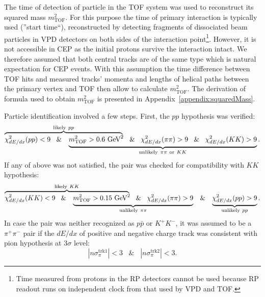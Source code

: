 The time of detection of particle in the TOF system was used to reconstruct its squared mass $m^{2}_{\text{TOF}}$. For this purpose the time of primary interaction is typically used (''start time``), reconstructed by detecting fragments of dissociated beam particles in VPD detectors on both sides of the interaction point\footnote{Time measured from protons in the RP detectors cannot be used because RP readout runs on independent clock from that used by VPD and TOF.}. However, it is not accessible in CEP as the initial protons survive the interaction intact. We therefore assumed that both central tracks are of the same type which is natural expectation for CEP events. With this assumption the time difference between TOF hits and measured tracks' momenta and lengths of helical paths between the primary vertex and TOF then allow to calculate $m^{2}_{\text{TOF}}$. The derivation of formula used to obtain $m^{2}_{\text{TOF}}$ is presented in Appendix~\ref{appendix:squaredMass}.

Particle identification involved a few steps. First, the $pp$ hypothesis was verified:
\begin{equation}\label{eq:pidPPbar}\lefteqn{\overbrace{\phantom{\chi^{2}_{dE/dx}(pp)<9\;\;\; \& \;\;\; m^{2}_{\text{TOF}} > 0.6~\mbox{GeV}^{2}}}^{\text{likely}~pp}}\chi^{2}_{dE/dx}(pp)<9\;\;\; \& \;\;\; \underbrace{m^{2}_{\text{TOF}} > 0.6~\mbox{GeV}^{2}\;\;\; \& \;\;\; \chi^{2}_{dE/dx}(\pi\pi)>9\;\;\; \& \;\;\; \chi^{2}_{dE/dx}(KK)>9}_{\text{unlikely}~\pi\pi~\text{or}~KK}.\end{equation}
If any of above was not satisfied, the pair was checked for compatibility with $KK$ hypothesis:
%
\begin{equation}\label{eq:pidKK}%
\lefteqn{\overbrace{\phantom{\chi^{2}_{dE/dx}(KK)<9\;\;\; \& \;\;\; m^{2}_{\text{TOF}} > 0.15~\mbox{GeV}^{2}}}^{\text{likely}~KK}}\chi^{2}_{dE/dx}(KK)<9\;\;\; \& \;\;\; \underbrace{m^{2}_{\text{TOF}} > 0.15~\mbox{GeV}^{2}\;\;\; \& \;\;\; \chi^{2}_{dE/dx}(\pi\pi)>9}_{\text{unlikely}~\pi\pi}\;\;\; \& \;\;\; \underbrace{\chi^{2}_{dE/dx}(pp)>9}_{\text{unlikely}~pp}.
\end{equation}
%
In case the pair was neither recognized as $p\bar{p}$ or $K^{+}K^{-}$, it was assumed to be a $\pi^{+}\pi^{-}$ pair if the $dE/dx$ of positive and negative charge track was consistent with pion hypothesis at $3\sigma$ level:
\begin{equation}\label{eq:pidPiPi}|n\sigma_{\pi}^{\text{trk1}}|<3\;\;\; \& \;\;\; |n\sigma_{\pi}^{\text{trk2}}|<3.\end{equation}




